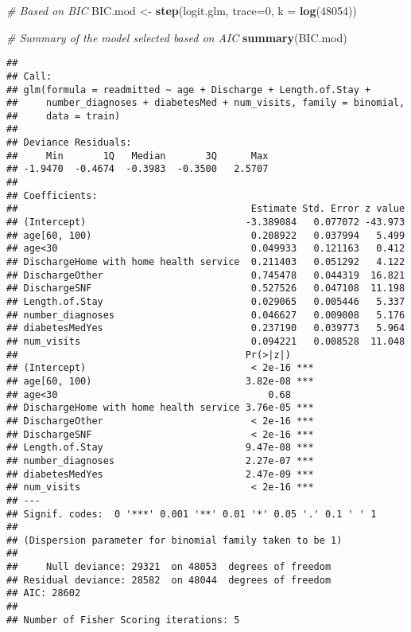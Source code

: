 \documentclass[
]{article}
\newenvironment{Shaded}{\begin{snugshade}}{\end{snugshade}}
\newcommand{\CommentTok}[1]{\textcolor[rgb]{0.56,0.35,0.01}{\textit{#1}}}
\newcommand{\DataTypeTok}[1]{\textcolor[rgb]{0.13,0.29,0.53}{#1}}
\newcommand{\DecValTok}[1]{\textcolor[rgb]{0.00,0.00,0.81}{#1}}
\newcommand{\KeywordTok}[1]{\textcolor[rgb]{0.13,0.29,0.53}{\textbf{#1}}}
\newcommand{\NormalTok}[1]{#1}
\newcommand{\StringTok}[1]{\textcolor[rgb]{0.31,0.60,0.02}{#1}}
\begin{document}
\begin{Shaded}
\begin{Highlighting}[]
\CommentTok{# Based on BIC}
\NormalTok{BIC.mod <-}\StringTok{ }\KeywordTok{step}\NormalTok{(logit.glm, }\DataTypeTok{trace=}\DecValTok{0}\NormalTok{, }\DataTypeTok{k =} \KeywordTok{log}\NormalTok{(}\DecValTok{48054}\NormalTok{))}

\CommentTok{# Summary of the model selected based on AIC}
\KeywordTok{summary}\NormalTok{(BIC.mod)}
\end{Highlighting}
\end{Shaded}

\begin{verbatim}
## 
## Call:
## glm(formula = readmitted ~ age + Discharge + Length.of.Stay + 
##     number_diagnoses + diabetesMed + num_visits, family = binomial, 
##     data = train)
## 
## Deviance Residuals: 
##     Min       1Q   Median       3Q      Max  
## -1.9470  -0.4674  -0.3983  -0.3500   2.5707  
## 
## Coefficients:
##                                         Estimate Std. Error z value
## (Intercept)                            -3.389084   0.077072 -43.973
## age[60, 100)                            0.208922   0.037994   5.499
## age<30                                  0.049933   0.121163   0.412
## DischargeHome with home health service  0.211403   0.051292   4.122
## DischargeOther                          0.745478   0.044319  16.821
## DischargeSNF                            0.527526   0.047108  11.198
## Length.of.Stay                          0.029065   0.005446   5.337
## number_diagnoses                        0.046627   0.009008   5.176
## diabetesMedYes                          0.237190   0.039773   5.964
## num_visits                              0.094221   0.008528  11.048
##                                        Pr(>|z|)    
## (Intercept)                             < 2e-16 ***
## age[60, 100)                           3.82e-08 ***
## age<30                                     0.68    
## DischargeHome with home health service 3.76e-05 ***
## DischargeOther                          < 2e-16 ***
## DischargeSNF                            < 2e-16 ***
## Length.of.Stay                         9.47e-08 ***
## number_diagnoses                       2.27e-07 ***
## diabetesMedYes                         2.47e-09 ***
## num_visits                              < 2e-16 ***
## ---
## Signif. codes:  0 '***' 0.001 '**' 0.01 '*' 0.05 '.' 0.1 ' ' 1
## 
## (Dispersion parameter for binomial family taken to be 1)
## 
##     Null deviance: 29321  on 48053  degrees of freedom
## Residual deviance: 28582  on 48044  degrees of freedom
## AIC: 28602
## 
## Number of Fisher Scoring iterations: 5
\end{verbatim}
\end{document}
